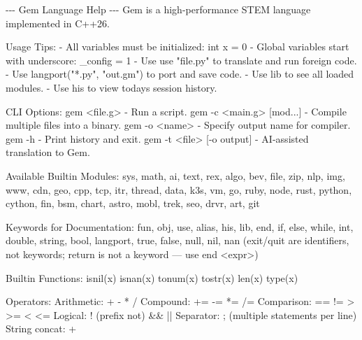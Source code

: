 \documentclass[
]{article}
\newenvironment{Shaded}{}{}
\newcommand{\NormalTok}[1]{#1}
\begin{document}
\begin{Shaded}
\begin{Highlighting}[]
\NormalTok{{-}{-}{-} Gem Language Help {-}{-}{-}}
\NormalTok{Gem is a high{-}performance STEM language implemented in C++26.}

\NormalTok{Usage Tips:}
\NormalTok{  {-} All variables must be initialized: \textquotesingle{}int x = 0\textquotesingle{}}
\NormalTok{  {-} Global variables start with underscore: \textquotesingle{}\_config = 1\textquotesingle{}}
\NormalTok{  {-} Use \textquotesingle{}use "file.py"\textquotesingle{} to translate and run foreign code.}
\NormalTok{  {-} Use \textquotesingle{}langport("*.py", "out.gm")\textquotesingle{} to port and save code.}
\NormalTok{  {-} Use \textquotesingle{}lib\textquotesingle{} to see all loaded modules.}
\NormalTok{  {-} Use \textquotesingle{}his\textquotesingle{} to view today\textquotesingle{}s session history.}

\NormalTok{CLI Options:}
\NormalTok{  gem \textless{}file.g\textgreater{}              {-} Run a script.}
\NormalTok{  gem {-}c \textless{}main.g\textgreater{} [mod...]  {-} Compile multiple files into a binary.}
\NormalTok{  gem {-}o \textless{}name\textgreater{}             {-} Specify output name for compiler.}
\NormalTok{  gem {-}h                    {-} Print history and exit.}
\NormalTok{  gem {-}t \textless{}file\textgreater{} [{-}o output] {-} AI{-}assisted translation to Gem.}

\NormalTok{Available Builtin Modules:}
\NormalTok{  sys, math, ai, text, rex, algo, bev, file, zip, nlp, img, www, cdn, geo,}
\NormalTok{  cpp, tcp, itr, thread, data, k3s, vm, go, ruby, node, rust,}
\NormalTok{  python, cython,}
\NormalTok{  fin, bsm, chart, astro, mobl, trek, seo, drvr, art,}
\NormalTok{  git}

\NormalTok{Keywords for Documentation:}
\NormalTok{  fun, obj, use, alias, his, lib, end, if, else, while,}
\NormalTok{  int, double, string, bool, langport,}
\NormalTok{  true, false, null, nil, nan}
\NormalTok{  (exit/quit are identifiers, not keywords; \textquotesingle{}return\textquotesingle{} is not a keyword — use \textquotesingle{}end \textless{}expr\textgreater{}\textquotesingle{})}

\NormalTok{Builtin Functions:}
\NormalTok{  isnil(x)  isnan(x)  tonum(x)  tostr(x)  len(x)  type(x)}

\NormalTok{Operators:}
\NormalTok{  Arithmetic:   +  {-}  *  /}
\NormalTok{  Compound:     +=  {-}=  *=  /=}
\NormalTok{  Comparison:   ==  !=  \textgreater{}  \textgreater{}=  \textless{}  \textless{}=}
\NormalTok{  Logical:      !  (prefix not)  \&\&  ||}
\NormalTok{  Separator:    ;  (multiple statements per line)}
\NormalTok{  String concat: +}


\end{Highlighting}
\end{Shaded}
\end{document}
